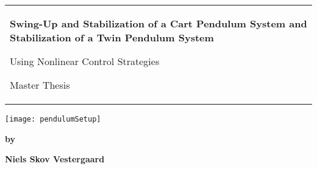 %
 \noindent%
  \vspace{-1.5cm}
  \begin{center}
    \noindent{\color{aaublue}\rule{\textwidth}{.5pt}}
  \end{center}
  \vspace{-.5cm}
  \begin{tabular}{@{}p{\textwidth}@{}}
    \begin{center}
      \Large{\textbf{
        Swing-Up and Stabilization of a Cart Pendulum System and  Stabilization of a Twin Pendulum System
      }}
    \end{center}
    \begin{center}
      \large{
        Using Nonlinear Control Strategies
      }
    \end{center}
    \begin{center}
      \large{
        Master Thesis %
      }
    \end{center}
  \end{tabular}
  \begin{center}
    \vspace{1cm}
    \texttt{[image: pendulumSetup]}
  \end{center}
  \vfill
  \begin{center}
    \textbf{by}
    
    \textbf{Niels Skov Vestergaard}
  \end{center}
\clearpage
